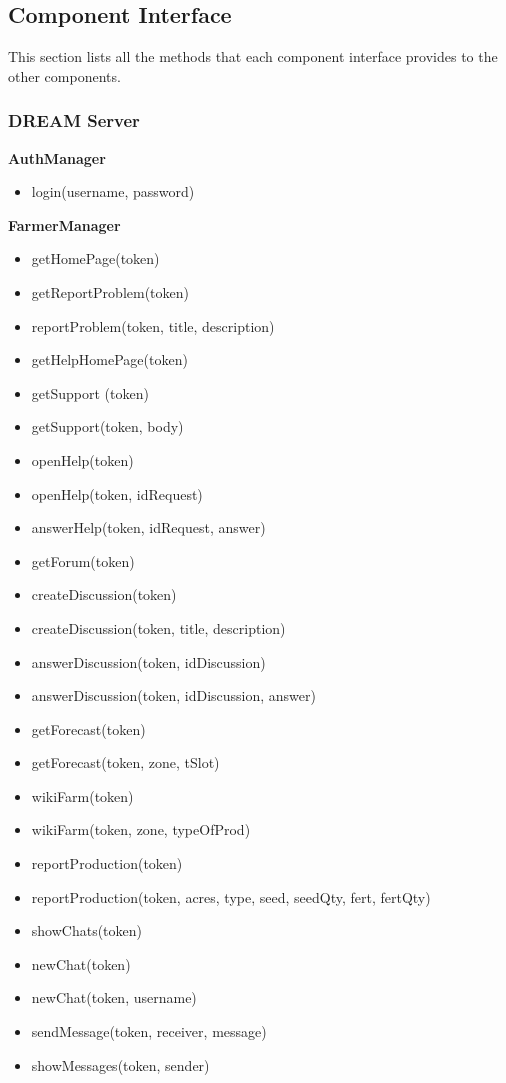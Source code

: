 \subsection{Component Interface}
This section lists all the methods that each component interface provides to the other components.
\subsubsection{DREAM Server}
\textbf{AuthManager}
\begin{itemize}
    \item login(username, password)
\end{itemize}
\textbf{FarmerManager}
\begin{itemize}
    \item getHomePage(token)
    \item getReportProblem(token)
    \item reportProblem(token, title, description)
    \item getHelpHomePage(token)
    \item getSupport (token)
    \item getSupport(token, body)
    \item openHelp(token)
    \item openHelp(token, idRequest)
    \item answerHelp(token, idRequest, answer)
    \item getForum(token)
    \item createDiscussion(token)
    \item createDiscussion(token, title, description)
    \item answerDiscussion(token, idDiscussion)
    \item answerDiscussion(token, idDiscussion, answer)
    \item getForecast(token)
    \item getForecast(token, zone, tSlot)
    \item wikiFarm(token)
    \item wikiFarm(token, zone, typeOfProd)
    \item reportProduction(token)
    \item reportProduction(token, acres, type, seed, seedQty, fert, fertQty)
    \item showChats(token)
    \item newChat(token)
    \item newChat(token, username)
    \item sendMessage(token, receiver, message)
    \item showMessages(token, sender)
\end{itemize}
